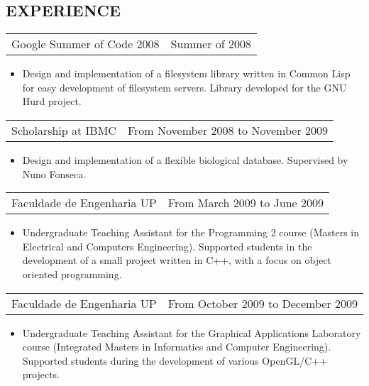 \documentclass[margin]{res}
\begin{document}
\begin{resume}
\section{EXPERIENCE}
            
                  \begin{tabular}{p{3in} r}
                  Google Summer of Code 2008 & Summer of 2008
                  \end{tabular}	
                   \begin{itemize} %
                    \item[]  Design and implementation of a filesystem library written in Common Lisp for easy development of filesystem servers. Library developed for the GNU Hurd project. 
		   \end{itemize} 
		   
		 \begin{tabular}{p{3in} r}
                  Scholarship at IBMC &  From November 2008 to November 2009 
                 \end{tabular}
		  \begin{itemize}
                   \item[] Design and implementation of a flexible biological database. Supervised by Nuno Fonseca.
                  \end{itemize}
                  
                 \begin{tabular}{p{3in} r} %
                  Faculdade de Engenharia UP &  From March 2009 to June 2009
                 \end{tabular}
                  \begin{itemize}					        
                   \item[] Undergraduate Teaching Assistant for the Programming 2 course (Masters in Electrical and Computers Engineering). Supported students in the development of a small project written in C++, with a focus on object oriented programming.
                  \end{itemize}
                  
                  \begin{tabular}{p{3in} r} %
                    Faculdade de Engenharia UP &  From October 2009 to December 2009
                   \end{tabular}
                    \begin{itemize}					        
                     \item[] Undergraduate Teaching Assistant for the Graphical Applications Laboratory course (Integrated Masters in Informatics and Computer Engineering). Supported students during the development of various OpenGL/C++ projects.
                    \end{itemize}
                    

\end{resume}
\end{document}
